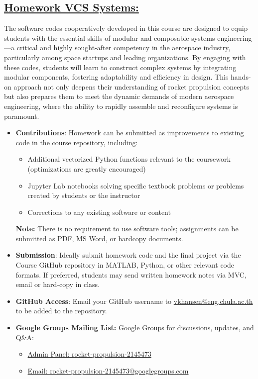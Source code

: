 \documentclass[12pt]{article}
\begin{document}
\subsection{\hyperref[sec:homework]{Homework VCS Systems:}}
\label{sec:homework}
The software codes cooperatively developed in this course are designed to equip students with the essential skills of modular and composable systems engineering—a critical and highly sought-after competency in the aerospace industry, particularly among space startups and leading organizations. By engaging with these codes, students will learn to construct complex systems by integrating modular components, fostering adaptability and efficiency in design. This hands-on approach not only deepens their understanding of rocket propulsion concepts but also prepares them to meet the dynamic demands of modern aerospace engineering, where the ability to rapidly assemble and reconfigure systems is paramount.
\begin{itemize}
    \item \textbf{Contributions}: Homework can be submitted as improvements to existing code in the course repository, including:
    \begin{itemize}
        \item Additional vectorized Python functions relevant to the coursework (optimizations are greatly encouraged)
        \item Jupyter Lab notebooks solving specific textbook problems or problems created by students or the instructor
        \item Corrections to any existing software or content
    \end{itemize}
    \textbf{Note:} There is no requirement to use software tools; assignments can be submitted as PDF, MS Word, or hardcopy documents.
    \item \textbf{Submission}: Ideally submit homework code and the final project via the Course GitHub repository in MATLAB, Python, or other relevant code formats. If preferred, students may send written homework notes via MVC, email or hard-copy in class.
    \item \textbf{GitHub Access}: Email your GitHub username to \href{mailto:vkhansen@eng.chula.ac.th}{vkhansen@eng.chula.ac.th} to be added to the repository.
    \item \textbf{Google Groups Mailing List:} Google Groups for discussions, updates, and Q\&A:
        \begin{itemize}
            \item \href{https://groups.google.com/g/rocket-propulsion-2145473}{Admin Panel: rocket-propulsion-2145473}
            \item \href{mailto:rocket-propulsion-2145473@googlegroups.com}{Email: rocket-propulsion-2145473@googlegroups.com}
        \end{itemize}
\end{itemize}
\end{document}
